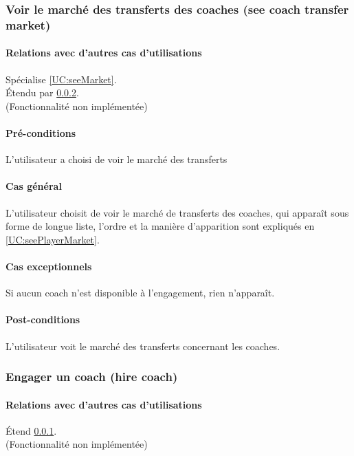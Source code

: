 \subsubsection{Voir le marché des transferts des coaches (see coach transfer market)}
\label{UC:seeCoachMarket}
\paragraph{Relations avec d'autres cas d'utilisations}
Spécialise \ref{UC:seeMarket}.\\
Étendu par \ref{UC:hireCoach}.
\\(Fonctionnalité non implémentée)
\paragraph{Pré-conditions}
\begin{list}{}{\leftmargin=1.5em}
\item{L'utilisateur a choisi de voir le marché des transferts}
\end{list}
\paragraph{Cas général}
L'utilisateur choisit de voir le marché de transferts des coaches, qui apparaît sous forme de longue liste, l'ordre et la manière d'apparition sont expliqués en \ref{UC:seePlayerMarket}.
\paragraph{Cas exceptionnels}
Si aucun coach n'est disponible à l'engagement, rien n'apparaît.
\paragraph{Post-conditions}
\begin{list}{}{\leftmargin=1.5em}
\item{L'utilisateur voit le marché des transferts concernant les coaches. }
\end{list}

\subsubsection{Engager un coach (hire coach)}
\label{UC:hireCoach}
\paragraph{Relations avec d'autres cas d'utilisations}
Étend \ref{UC:seeCoachMarket}.
\\(Fonctionnalité non implémentée)
